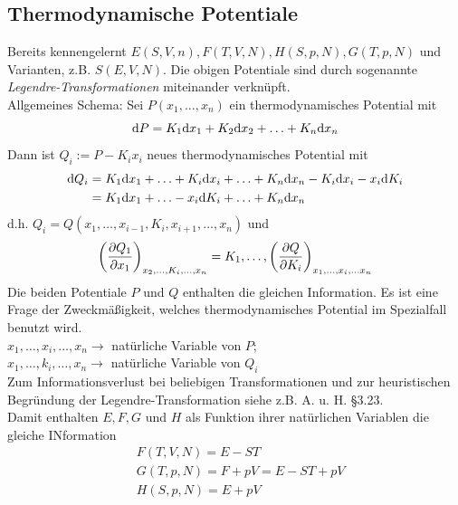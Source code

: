 \subsection{Thermodynamische Potentiale}
Bereits kennengelernt $E(S, V, n), F(T, V, N), H(S, p, N), G(T, p, N)$ und Varianten, z.B. $S(E, V, N)$. Die obigen Potentiale
sind durch sogenannte \emph{Legendre-Transformationen} miteinander verknüpft. \\
Allgemeines Schema: Sei $P(x_1, \ldots, x_n)$ ein thermodynamisches Potential mit
\begin{equation}
    \mathrm{d} P = K_1 \mathrm{d} x_1 + K_2 \mathrm{d} x_2 + \ldots + K_n \mathrm{d} x_n
\end{equation}
Dann ist $Q_i := P - K_i x_i$ neues thermodynamisches Potential mit
\begin{equation}
    \begin{split}
        \mathrm{d} Q_i &= K_1 \mathrm{d} x_1 + \ldots + K_i \mathrm{d} x_i + \ldots + K_n \mathrm{d} x_n - K_i \mathrm{d} x_i - x_i \mathrm{d} K_i \\
        & = K_1 \mathrm{d} x_1 + \ldots - x_i \mathrm{d} K_i + \ldots + K_n \mathrm{d} x_n
    \end{split}
\end{equation}
d.h. $Q_i = Q(x_1, \ldots, x_{i-1}, K_i, x_{i+1}, \ldots, x_n)$ und
\begin{equation}
    \pdi{Q_1}{x_1}{x_2, \ldots, K_i, \ldots, x_n} = K_1, \ldots, \pdi{Q}{K_i}{x_1, \ldots, x_i, \ldots x_n} %
\end{equation}
Die beiden Potentiale $P$ und $Q$ enthalten die gleichen Information. Es ist eine Frage der Zweckmäßigkeit, welches thermodynamisches Potential
im Spezialfall benutzt wird. \\
$x_1, \ldots, x_i, \ldots, x_n \to $ natürliche Variable von $P$; \\
$x_1, \ldots, k_i, \ldots, x_n \to$ natürliche Variable von $Q_i$ \\
Zum Informationsverlust bei beliebigen Transformationen und zur heuristischen Begründung der Legendre-Transformation siehe z.B. A. u. H. §3.23. \\[\baselineskip]
Damit enthalten $E, F, G$ und $H$ als Funktion ihrer natürlichen Variablen die gleiche INformation
\begin{equation}
    \begin{split}
        & F(T, V, N) = E - ST \\
        & G(T, p, N) = F + p V = E - ST + pV \\
        & H(S, p, N) = E + pV
    \end{split}
\end{equation}
